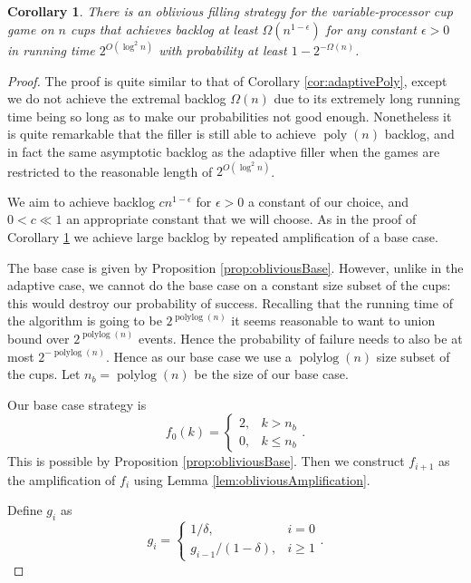 \documentclass[twocolumn]{article}[10pt]
\DeclareMathOperator{\polylog}{\text{polylog}}
\DeclareMathOperator{\poly}{\text{poly}}
\newtheorem{corollary}{Corollary}
\begin{document}
\begin{corollary}
  \label{cor:obliviousPoly}
  There is an oblivious filling strategy for the variable-processor cup game on
  $n$ cups that achieves backlog at least $\Omega(n^{1-\epsilon})$ for any
  constant $\epsilon >0$ in running time $2^{O(\log^2 n)}$ with probability at least $1-2^{-\Omega(n)}$.
\end{corollary}
\begin{proof}
  The proof is quite similar to that of Corollary \ref{cor:adaptivePoly},
  except we do not achieve the extremal backlog $\Omega(n)$ due to its
  extremely long running time being so long as to make our probabilities not
  good enough. Nonetheless it is quite remarkable that the filler is still able to 
  achieve $\poly(n)$ backlog, and in fact the same asymptotic backlog as the
  adaptive filler when the games are restricted to the reasonable length of
  $2^{O(\log^2 n)}$.

  We aim to achieve backlog $cn^{1-\epsilon}$ for $\epsilon >  0$ a constant of
  our choice, and $0< c \ll 1$ an appropriate constant that we will choose.
  As in the proof of Corollary \ref{cor:obliviousPoly} we achieve large backlog
  by repeated amplification of a base case. 

  The base case is given by Proposition \ref{prop:obliviousBase}. However,
  unlike in the adaptive case, we cannot do the base case on a constant size
  subset of the cups: this would destroy our probability of success. Recalling
  that the running time of the algorithm is going to be $2^{\polylog(n)}$ it
  seems reasonable to want to union bound over $2^{\polylog(n)}$ events. Hence
  the probability of failure needs to also be at most $2^{-\polylog(n)}$.
  Hence as our base case we use a $\polylog(n)$ size subset of the cups. 
  Let $n_b = \polylog(n)$ be the size of our base case.

  Our base case strategy is 
  $$
  f_0(k)=
  \begin{cases}
    2, & k > n_b\\
    0, & k \le n_b
  \end{cases}.$$
  This is possible by Proposition \ref{prop:obliviousBase}.
  Then we construct $f_{i+1}$ as the amplification of $f_i$ using Lemma \ref{lem:obliviousAmplification}.

  Define $g_i$ as 
  $$
  g_i =
  \begin{cases}
    1/\delta, & i=0\\
    g_{i-1}/(1-\delta), & i\ge 1 
  \end{cases}.$$


\end{proof}
\end{document}
